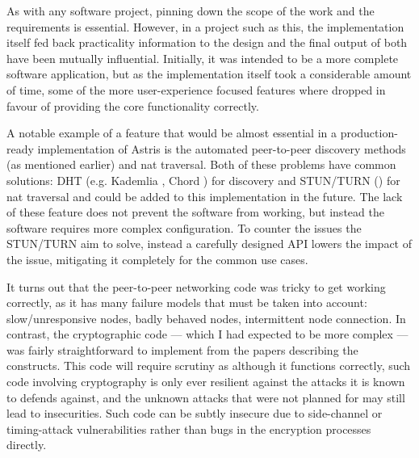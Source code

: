 As with any software project, pinning down the scope of the work and the requirements is essential. However, in a project such as this, the implementation itself fed back practicality information to the design and the final output of both have been mutually influential. Initially, it was intended to be a more complete software application, but as the implementation itself took a considerable amount of time, some of the more user-experience focused features where dropped in favour of providing the core functionality correctly.

A notable example of a feature that would be almost essential in a production-ready implementation of Astris is the automated peer-to-peer discovery methods (as mentioned earlier) and \gls{nat} traversal. Both of these problems have common solutions: DHT (e.g. Kademlia \cite{maymounkovKademliaPeertopeerInformation2002}, Chord \cite{ionstoicaChordScalablePeertopeer}) for discovery and STUN/TURN () for \gls{nat} traversal and could be added to this implementation in the future. The lack of these feature does not prevent the software from working, but instead the software requires more complex configuration. To counter the issues the STUN/TURN aim to solve, instead a carefully designed API lowers the impact of the issue, mitigating it completely for the common use cases.

It turns out that the peer-to-peer networking code was tricky to get working correctly, as it has many failure models that must be taken into account: slow/unresponsive nodes, badly behaved nodes, intermittent node connection. In contrast, the cryptographic code --- which I had expected to be more complex --- was fairly straightforward to implement from the papers  describing the constructs. This code will require scrutiny as although it functions correctly, such code involving cryptography is only ever resilient against the attacks it is known to defends against, and the unknown attacks that were not planned for may still lead to insecurities. Such code can be subtly insecure due to side-channel or timing-attack vulnerabilities rather than bugs in the encryption processes directly.
